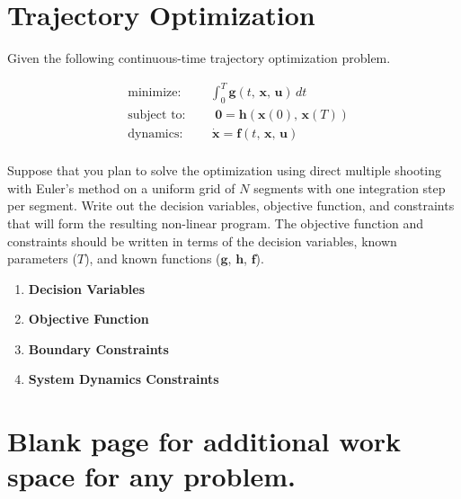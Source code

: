 \pagebreak
\section{Trajectory Optimization}

Given the following continuous-time trajectory optimization problem.

\begin{align*}
  & \text{minimize: } \qquad \int_0^T \! \bm{g}(t,\, \bm{x},\, \bm{u}) \, dt \\
  & \text{subject to: } \qquad \bm{0} = \bm{h}(\bm{x}(0), \, \bm{x}(T)) \\
  & \text{dynamics: } \qquad \dot{\bm{x}} = \bm{f}(t,\, \bm{x},\, \bm{u}) \\
\end{align*}

Suppose that you plan to solve the optimization using
direct multiple shooting with Euler's method
on a uniform grid of $N$ segments with one integration step per segment.
Write out the decision variables,
objective function, and constraints that will form the resulting non-linear program.
The objective function and constraints should be written in terms of the
decision variables, known parameters ($T$),
and known functions ($\bm{g}$, $\bm{h}$, $\bm{f}$).

\begin{enumerate}
  \item \textbf{Decision Variables}
  \vspace{4em}
  \item \textbf{Objective Function}
  \vspace{6em}
  \item \textbf{Boundary Constraints}
  \vspace{10em}
  \item \textbf{System Dynamics Constraints}
  \vspace{10em}
\end{enumerate}

\pagebreak
\section*{Blank page for additional work space for any problem.}



